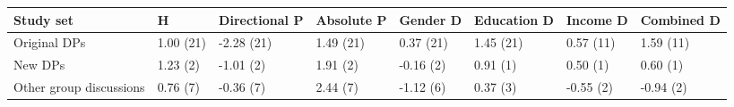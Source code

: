 
\begin{tabular}{llllllll}
\toprule
Study set & H & Directional P & Absolute P & Gender D & Education D & Income D & Combined D\\
\midrule
Original DPs & 1.00 (21) & -2.28 (21) & 1.49 (21) & 0.37 (21) & 1.45 (21) & 0.57 (11) & 1.59 (11)\\
New DPs & 1.23 (2) & -1.01 (2) & 1.91 (2) & -0.16 (2) & 0.91 (1) & 0.50 (1) & 0.60 (1)\\
Other group discussions & 0.76 (7) & -0.36 (7) & 2.44 (7) & -1.12 (6) & 0.37 (3) & -0.55 (2) & -0.94 (2)\\
\bottomrule
\end{tabular}

